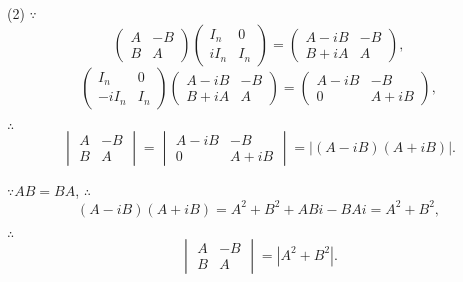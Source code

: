 \documentclass{ctexart}
\begin{document}
\begin{solution}
    (2) $\because$
    \[\begin{pmatrix}
        A & -B \\
        B & A
    \end{pmatrix}\begin{pmatrix}
        I_n & 0 \\
        iI_n & I_n
    \end{pmatrix}=\begin{pmatrix}
        A-iB & -B \\
        B+iA & A
    \end{pmatrix},\]
    \[\begin{pmatrix}
        I_n & 0 \\
        -iI_n & I_n
    \end{pmatrix}\begin{pmatrix}
        A-iB & -B \\
        B+iA & A
    \end{pmatrix}=\begin{pmatrix}
        A-iB & -B \\
        0 & A+iB
    \end{pmatrix},\]

    $\therefore$
    \[\begin{vmatrix}
        A & -B \\
        B & A
    \end{vmatrix}=\begin{vmatrix}
        A-iB & -B \\
        0 & A+iB
    \end{vmatrix}=|(A-iB)(A+iB)|.\]

    $\because AB=BA$, $\therefore$
    \[(A-iB)(A+iB)=A^2+B^2+ABi-BAi=A^2+B^2,\]

    $\therefore$
    \[\begin{vmatrix}
        A & -B \\
        B & A
    \end{vmatrix}=|A^2+B^2|.\]
\end{solution}
\end{document}
